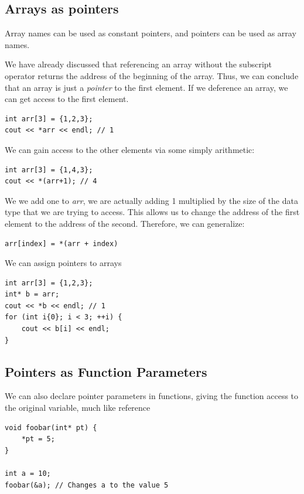 \documentclass{report}
\begin{document}
    \subsection{Arrays as pointers}
    \bigbreak \noindent 
    \begin{concept}
 Array names can be used as constant pointers, and pointers can be used as array names.
	\end{concept}
    \bigbreak \noindent 
    We have already discussed that referencing an array without the subscript operator returns the address of the beginning of the array. Thus, we can conclude that an array is just a \textit{pointer} to the first element.
    \bigbreak \noindent 
    If we deference an array, we can get access to the first element.
    \bigbreak \noindent 
    \sepline
    \begin{verbatim}
int arr[3] = {1,2,3};
cout << *arr << endl; // 1
    \end{verbatim}
    \sepline
    \bigbreak \noindent 
    We can gain access to the other elements via some simply arithmetic:
    \bigbreak \noindent 
    \sepline
    \begin{verbatim}
int arr[3] = {1,4,3};
cout << *(arr+1); // 4
    \end{verbatim}
    \sepline
    \bigbreak \noindent 
    We we add one to \textit{arr}, we are actually adding 1 multiplied by the size of the data type that we are trying to access. This allows us to change the address of the first element to the address of the second.
    \bigbreak \noindent 
    Therefore, we can generalize:
    \bigbreak \noindent 
    \sepline
    \begin{verbatim}
arr[index] = *(arr + index)
    \end{verbatim}
    \sepline

    \bigbreak \noindent 
    We can assign pointers to arrays
    \bigbreak \noindent 
    \sepline
    \begin{verbatim}
int arr[3] = {1,2,3};
int* b = arr;
cout << *b << endl; // 1
for (int i{0}; i < 3; ++i) {
    cout << b[i] << endl;
}
    \end{verbatim}
    \sepline

    \pagebreak \bigbreak \noindent 
    \subsection{Pointers as Function Parameters}
    \bigbreak \noindent 
    We can also declare pointer parameters in functions, giving the function access to the original variable, much like reference
    \bigbreak \noindent 
    \sepline
    \begin{verbatim}
void foobar(int* pt) {
    *pt = 5;
}

int a = 10;
foobar(&a); // Changes a to the value 5

    \end{verbatim}
    \sepline
\end{document}
